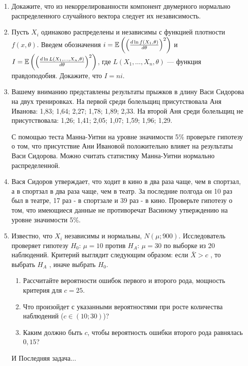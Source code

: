 \documentclass[pdftex,12pt,a4paper]{article}
\begin{document}
\begin{enumerate}
\item Докажите, что из некоррелированности компонент двумерного нормально распределенного случайного вектора следует их независимость. 
\item Пусть $X_i$ одинаково распределены и независимы с функцией плотности $f(x,\theta)$. Введем обозначения $i=\mathbb{E}\left(\left(\frac{d \ln f(X_1,\theta)}{d\theta}\right)^2\right)$ и $I=\mathbb{E}\left(\left(\frac{d \ln L(X_1,\ldots,X_n,\theta)}{d\theta}\right)^2\right)$, где $L(X_1,\ldots, X_n,\theta)$ --- функция правдоподобия. Докажите, что $I=ni$.

\item Вашему вниманию представлены результаты прыжков в длину
Васи Сидорова на двух тренировках. На первой среди болельщиц
присутствовала Аня Иванова: 1,83; 1,64; 2,27;
1,78; 1,89; 2,33. На второй Аня среди болельщиц не
присутствовала: 1,26; 1,41; 2,05; 1,07; 1,59; 1,96; 1,29.

С помощью теста Манна-Уитни на уровне значимости 5\% проверьте гипотезу о
том, что присутствие Ани Ивановой положительно влияет на
результаты Васи Сидорова. Можно считать статистику Манна-Уитни нормально распределенной.


\item Вася Сидоров утверждает, что ходит в кино в два раза чаще, чем в
спортзал, а в спортзал в два раза чаще, чем в театр. За последние
полгода он 10 раз был в театре, 17 раз - в спортзале и
39 раз - в кино. Проверьте гипотезу о том, что имеющиеся данные не противоречат Васиному утверждению на уровне значимости 5\%.

\newpage

\item  Известно, что  $X_{i}$ независимы и нормальны, $N\left(\mu ;900\right)$.
Исследователь проверяет гипотезу $H_{0}$: $\mu =10$  против
$H_{A}$: $\mu =30$  по выборке из 20 наблюдений. Критерий выглядит
следующим образом: если  $\bar{X}>c$ , то выбрать  $H_{A} $ ,
иначе выбрать  $H_{0} $.
\begin{enumerate}
\item  Рассчитайте вероятности ошибок
первого и второго рода, мощность критерия для $c=25$. 
\item Что произойдет с указанными вероятностями при росте количества
наблюдений ($c\in(10;30)$)?
\item Каким должно быть $c$, чтобы вероятность ошибки второго рода
равнялась $0,15$?
\end{enumerate}




И Последняя задача...


\end{enumerate}
\end{document}
